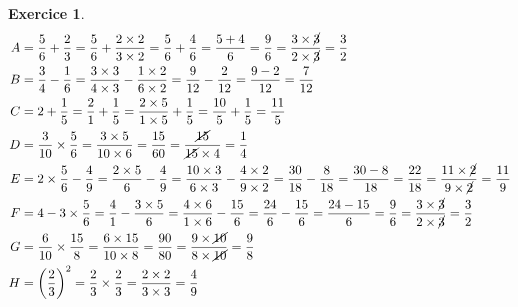 \documentclass[10pt]{article}
\newtheorem{exo}{Exercice}
\begin{document}
\begin{exo}

\begin{align*}
A&=\frac{5}{6}+\frac{2}{3}=\frac{5}{6}+\frac{2\times 2}{3\times 2}=\frac{5}{6}+\frac{4}{6}=\frac{5+4}{6}=\frac{9}{6}=\frac{3\times \cancel{3}}{2\times \cancel{3}}=\frac{3}{2}\\
B&=\frac{3}{4}-\frac{1}{6}=\frac{3\times 3}{4\times 3}-\frac{1\times 2}{6\times 2}=\frac{9}{12}-\frac{2}{12}=\frac{9-2}{12}=\frac{7}{12}
\\
C&=2+\frac{1}{5}=\frac{2}{1}+\frac{1}{5}=\frac{2\times 5}{1\times 5}+\frac{1}{5}=\frac{10}{5}+\frac{1}{5}=\frac{11}{5}\\
D&=\frac{3}{10}\times \frac{5}{6}=\frac{3\times 5}{10\times 6}=\frac{15}{60}=\frac{\cancel{15}}{\cancel{15}\times 4}=\frac{1}{4}\\
E&=2\times\frac{5}{6}-\frac{4}{9}=\frac{2\times 5}{6}-\frac{4}{9}=\frac{10\times 3}{6\times 3}-\frac{4\times 2}{9\times 2}=\frac{30}{18}-\frac{8}{18}=\frac{30-8}{18}=\frac{22}{18}=\frac{11\times \cancel{2}}{9\times \cancel{2}}=\frac{11}{9}\\
F&=4-3\times\frac{5}{6}=\frac{4}{1}-\frac{3\times 5}{6}=\frac{4\times 6}{1\times 6}-\frac{15}{6}=\frac{24}{6}-\frac{15}{6}=\frac{24-15}{6}=\frac{9}{6}=\frac{3\times \cancel{3}}{2\times \cancel{3}}=\frac{3}{2}
\\
G&=\frac{6}{10}\times \frac{15}{8}=\frac{6\times 15}{10\times 8}=\frac{90}{80}=\frac{9\times \cancel{10}}{8\times \cancel{10}}=\frac{9}{8}\\
H&=\left(\frac{2}{3}\right)^2=\frac{2}{3}\times\frac{2}{3}=\frac{2\times 2}{3\times 3}=\frac{4}{9}
\end{align*}

\end{exo}
\end{document}
